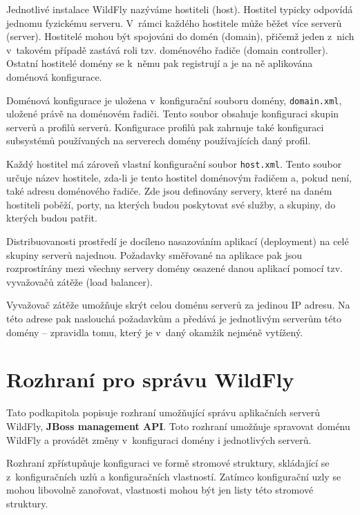 Jednotlivé instalace WildFly nazýváme hostiteli (host). Hostitel typicky odpovídá jednomu fyzickému serveru.
V~rámci každého hostitele může běžet více serverů (server).
Hostitelé mohou být spojováni do domén (domain), přičemž jeden z~nich v~takovém případě zastává roli tzv. doménového řadiče (domain controller).
Ostatní hostitelé domény se k~němu pak registrují a je na ně aplikována doménová konfigurace.
\cite{jbossDomainSetup}

Doménová konfigurace je uložena v~konfigurační souboru domény, {\tt domain.xml}, uložené právě na doménovém řadiči.
Tento soubor obsahuje konfiguraci skupin serverů a profilů serverů.
Konfigurace profilů pak zahrnuje také konfiguraci subsystémů používaných na serverech domény používajících daný profil.
\cite{jbossDomainSetup}

Každý hostitel má zároveň vlastní konfigurační soubor {\tt host.xml}.
Tento soubor určuje název hostitele, zda-li je tento hostitel doménovým řadičem a, pokud není, také adresu doménového řadiče.
Zde jsou definovány servery, které na daném hostiteli poběží, porty, na kterých budou poskytovat své služby, a skupiny, do kterých budou patřit.
\cite{jbossDomainSetup}

Distribuovanosti prostředí je docíleno nasazováním aplikací (deployment) na celé skupiny serverů najednou.
Požadavky směřované na aplikace pak jsou rozprostírány mezi všechny servery domény osazené danou aplikací pomocí tzv. vyvažovačů zátěže (load balancer).
\cite{jbossLoadBalancing}

Vyvažovač zátěže umožňuje skrýt celou doménu serverů za jedinou IP adresu.
Na této adrese pak naslouchá požadavkům a předává je jednotlivým serverům této domény -- zpravidla tomu, který je v~daný okamžik nejméně vytížený.
\cite{jbossLoadBalancing}

\section{Rozhraní pro správu WildFly} \label{managementAPI}

Tato podkapitola popisuje rozhraní umožňující správu aplikačních serverů WildFly, {\bf JBoss management API}.
Toto rozhraní umožňuje spravovat doménu WildFly a provádět změny v~konfiguraci domény i jednotlivých serverů.
\cite{jbossDetypedManagement}

Rozhraní zpřístupňuje konfiguraci ve formě stromové struktury, skládající se z~konfiguračních uzlů a konfiguračních vlastností.
Zatímco konfigurační uzly se mohou libovolně zanořovat, vlastnosti mohou být jen listy této stromové struktury.
\cite{jbossDetypedManagement}

